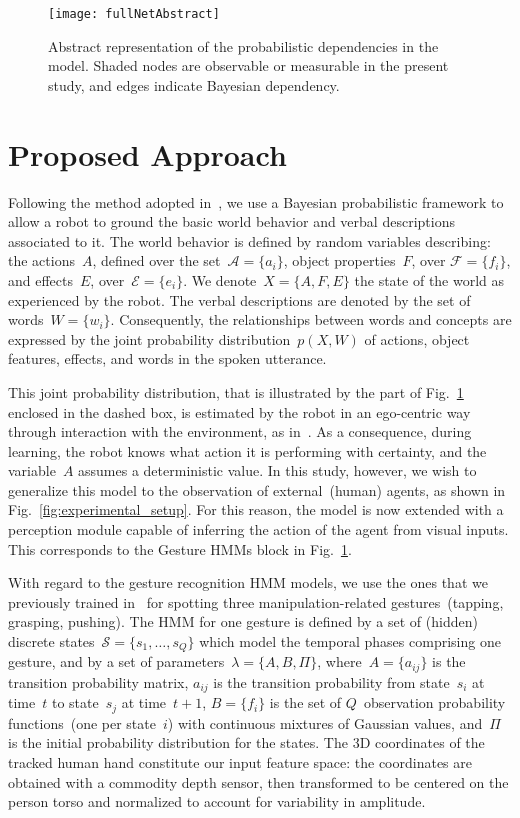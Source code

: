 
\begin{figure}
  \centering
  \texttt{[image: fullNetAbstract]}
  \caption{Abstract representation of the probabilistic dependencies in the model. Shaded nodes are observable or measurable in the present study, and edges indicate Bayesian dependency.}
  \label{fig:model}
\end{figure}

\section{Proposed Approach}
Following the method adopted in~\cite{salvi:2012:smcb}, we use a Bayesian probabilistic framework to allow a robot to ground the basic world behavior and verbal descriptions associated to it. The world behavior is defined by random variables describing: the actions~$A$, defined over the set~$\mathcal{A} = \{a_i\}$, object properties~$F$, over $\mathcal{F} = \{f_i\}$, and effects~$E$, over~$\mathcal{E} = \{e_i\}$. We denote~$X = \{A, F, E\}$ the state of the world as experienced by the robot. The verbal descriptions are denoted by the set of words~$W = \{w_i\}$. Consequently, the relationships between words and concepts are expressed by the joint probability distribution~$p(X,W)$ of actions, object features, effects, and words in the spoken utterance.

This joint probability distribution, that is illustrated by the part of Fig.~\ref{fig:model} enclosed in the dashed box, is estimated by the robot in an ego-centric way through interaction with the environment, as in~\cite{salvi:2012:smcb}. As a consequence, during learning, the robot knows what action it is performing with certainty, and the variable~$A$ assumes a deterministic value. In this study, however, we wish to generalize this model to the observation of external~(human) agents, as shown in Fig.~\ref{fig:experimental_setup}. For this reason, the model is now extended with a perception module capable of inferring the action of the agent from visual inputs. This corresponds to the Gesture \acp{HMM} block in Fig.~\ref{fig:model}.

With regard to the gesture recognition \ac{HMM} models, we use the ones that we previously trained in~\cite{saponaro:2013:crhri} for spotting three manipulation-related gestures~(tapping, grasping, pushing). The \ac{HMM} for one gesture is defined by a set of (hidden) discrete states~$\mathcal{S} = \{s_1, \dots, s_Q\}$ which model the temporal phases comprising one gesture, and by a set of parameters~$\lambda = \{ A, B, \Pi \}$, where~$A = \{ a_{ij} \}$ is the transition probability matrix, $a_{ij}$ is the transition probability from state~$s_i$ at time~$t$ to state~$s_j$ at time~$t+1$, $B = \{ f_i \}$ is the set of $Q$~observation probability functions~(one per state~$i$) with continuous mixtures of Gaussian values, and~$\Pi$ is the initial probability distribution for the states. The 3D coordinates of the tracked human hand constitute our input feature space: the coordinates are obtained with a commodity depth sensor, then transformed to be centered on the person torso and normalized to account for variability in amplitude.


